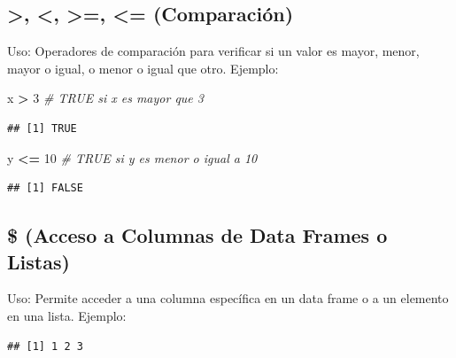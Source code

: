 \documentclass[
]{book}
\newenvironment{Shaded}{\begin{snugshade}}{\end{snugshade}}
\newcommand{\AttributeTok}[1]{\textcolor[rgb]{0.13,0.29,0.53}{#1}}
\newcommand{\CommentTok}[1]{\textcolor[rgb]{0.56,0.35,0.01}{\textit{#1}}}
\newcommand{\DecValTok}[1]{\textcolor[rgb]{0.00,0.00,0.81}{#1}}
\newcommand{\FunctionTok}[1]{\textcolor[rgb]{0.13,0.29,0.53}{\textbf{#1}}}
\newcommand{\NormalTok}[1]{#1}
\newcommand{\OtherTok}[1]{\textcolor[rgb]{0.56,0.35,0.01}{#1}}
\newcommand{\SpecialCharTok}[1]{\textcolor[rgb]{0.81,0.36,0.00}{\textbf{#1}}}
\begin{document}
\subsection{\textgreater, \textless, \textgreater=, \textless= (Comparación)}\label{comparaciuxf3n}

Uso: Operadores de comparación para verificar si un valor es mayor, menor, mayor o igual, o menor o igual que otro.
Ejemplo:

\begin{Shaded}
\begin{Highlighting}[]
\NormalTok{x }\SpecialCharTok{\textgreater{}} \DecValTok{3}   \CommentTok{\# TRUE si x es mayor que 3}
\end{Highlighting}
\end{Shaded}

\begin{verbatim}
## [1] TRUE
\end{verbatim}

\begin{Shaded}
\begin{Highlighting}[]
\NormalTok{y }\SpecialCharTok{\textless{}=} \DecValTok{10} \CommentTok{\# TRUE si y es menor o igual a 10}
\end{Highlighting}
\end{Shaded}

\begin{verbatim}
## [1] FALSE
\end{verbatim}

\subsection{\$ (Acceso a Columnas de Data Frames o Listas)}\label{acceso}

Uso: Permite acceder a una columna específica en un data frame o a un elemento en una lista.
Ejemplo:

\begin{Shaded}
\end{Shaded}

\begin{verbatim}
## [1] 1 2 3
\end{verbatim}
\end{document}
